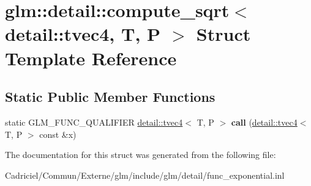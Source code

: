 \hypertarget{structglm_1_1detail_1_1compute__sqrt_3_01detail_1_1tvec4_00_01_t_00_01_p_01_4}{}\section{glm\+:\+:detail\+:\+:compute\+\_\+sqrt$<$ detail\+:\+:tvec4, T, P $>$ Struct Template Reference}
\label{structglm_1_1detail_1_1compute__sqrt_3_01detail_1_1tvec4_00_01_t_00_01_p_01_4}
\subsection*{Static Public Member Functions}
\begin{DoxyCompactItemize}
\item 
static G\+L\+M\+\_\+\+F\+U\+N\+C\+\_\+\+Q\+U\+A\+L\+I\+F\+I\+ER \hyperlink{structglm_1_1detail_1_1tvec4}{detail\+::tvec4}$<$ T, P $>$ {\bfseries call} (\hyperlink{structglm_1_1detail_1_1tvec4}{detail\+::tvec4}$<$ T, P $>$ const \&x)\hypertarget{structglm_1_1detail_1_1compute__sqrt_3_01detail_1_1tvec4_00_01_t_00_01_p_01_4_a75a6bf4911534e88541e66391ffb3f6e}{}\label{structglm_1_1detail_1_1compute__sqrt_3_01detail_1_1tvec4_00_01_t_00_01_p_01_4_a75a6bf4911534e88541e66391ffb3f6e}

\end{DoxyCompactItemize}


The documentation for this struct was generated from the following file\+:\begin{DoxyCompactItemize}
\item 
Cadriciel/\+Commun/\+Externe/glm/include/glm/detail/func\+\_\+exponential.\+inl\end{DoxyCompactItemize}
